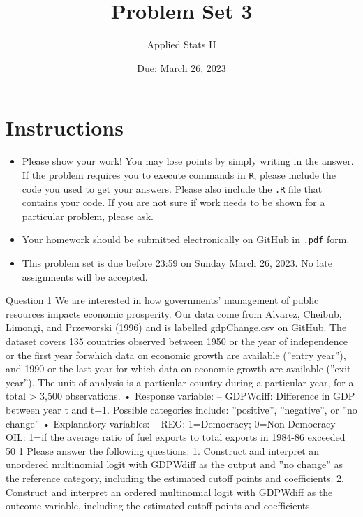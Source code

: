 \documentclass[12pt,letterpaper]{article}
\title{Problem Set 3}
\date{Due: March 26, 2023}
\author{Applied Stats II}
\begin{document}
	\maketitle
	\section*{Instructions}
	\begin{itemize}
		\item Please show your work! You may lose points by simply writing in the answer. If the problem requires you to execute commands in \texttt{R}, please include the code you used to get your answers. Please also include the \texttt{.R} file that contains your code. If you are not sure if work needs to be shown for a particular problem, please ask.
		\item Your homework should be submitted electronically on GitHub in \texttt{.pdf} form.
		\item This problem set is due before 23:59 on Sunday March 26, 2023. No late assignments will be accepted.
	\end{itemize}

	
	

	\vspace{.25cm}
\noindent Question 1
We are interested in how governments’ management of public resources impacts economic prosperity. Our data come from Alvarez, Cheibub, Limongi, and Przeworski (1996) and is labelled gdpChange.csv on GitHub. The dataset covers 135 countries observed between 1950 or the year of independence or the first year forwhich data on economic growth are available (”entry year”), and 1990 or the last year for which data on economic growth are available (”exit year”). The unit of analysis is a particular country during a particular year, for a total > 3,500 observations.
• Response variable:
– GDPWdiff: Difference in GDP between year t and t−1. Possible categories include:
”positive”, ”negative”, or ”no change” • Explanatory variables:
– REG: 1=Democracy; 0=Non-Democracy
– OIL: 1=if the average ratio of fuel exports to total exports in 1984-86 exceeded 50%
1
Please answer the following questions:
1. Construct and interpret an unordered multinomial logit with GDPWdiff as the output and ”no change” as the reference category, including the estimated cutoff points and coefficients.
2. Construct and interpret an ordered multinomial logit with GDPWdiff as the outcome variable, including the estimated cutoff points and coefficients. \\
\end{document}
